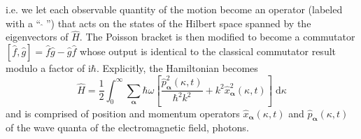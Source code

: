 \documentclass{article}
\numberwithin{equation}{section}
\begin{document}
i.e. we let each observable quantity of the motion become an operator (labeled with a ``$\;\hat{}\;$'') that acts on the states of the Hilbert space spanned by the eigenvectors of $\hat{H}$. The Poisson bracket is then modified to become a commutator $[\hat{f},\hat{g}] = \hat{f}\hat{g} - \hat{g}\hat{f}$ whose output is identical to the classical commutator result modulo a factor of $\mathrm{i}\hbar$. Explicitly, the Hamiltonian becomes
\begin{equation}\label{eq:Hhat1}
\hat{H} = \frac{1}{2}\int_0^{\infty}\sum_{\bm{\alpha}}\hbar\omega\left[\frac{\hat{p}_{\bm{\alpha}}^2(\kappa,t)}{\hbar^2 k^2} + k^2\hat{x}^2_{\bm{\alpha}}(\kappa,t)\right]\;\mathrm{d}\kappa
\end{equation}
and is comprised of position and momentum operators $\hat{x}_{\bm{\alpha}}(\kappa,t)$ and $\hat{p}_{\bm{\alpha}}(\kappa,t)$ of the wave quanta of the electromagnetic field, photons.
\end{document}
